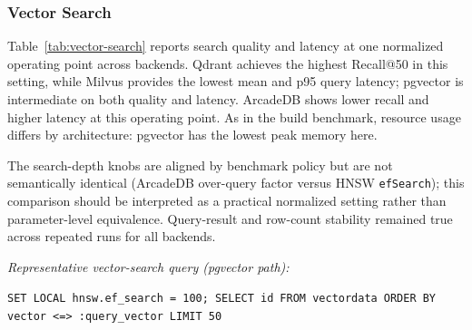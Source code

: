 \documentclass[sigconf, nonacm]{acmart}
\begin{document}
\subsubsection{Vector Search}

\begin{table}[tb]
  \centering
  \caption{Vector search on Stack Overflow vectors (k=50, 1,000 queries, mean over 3 runs; normalized depth: ArcadeDB over-query factor=4, pgvector/Qdrant/Milvus \texttt{efSearch}=100).}
  \label{tab:vector-search}
  \small
\end{table}

Table~\ref{tab:vector-search} reports search quality and latency at one normalized operating point across backends. Qdrant achieves the highest Recall@50 in this setting, while Milvus provides the lowest mean and p95 query latency; pgvector is intermediate on both quality and latency. ArcadeDB shows lower recall and higher latency at this operating point. As in the build benchmark, resource usage differs by architecture: pgvector has the lowest peak memory here.

The search-depth knobs are aligned by benchmark policy but are not semantically identical (ArcadeDB over-query factor versus HNSW \texttt{efSearch}); this comparison should be interpreted as a practical normalized setting rather than parameter-level equivalence. Query-result and row-count stability remained true across repeated runs for all backends.

\par\smallskip\noindent\hspace*{1em}\textit{Representative vector-search query (pgvector path):}
\begin{flushleft}
\small
\texttt{SET LOCAL hnsw.ef\_search = 100;}\
\texttt{SELECT id}\
\texttt{FROM vectordata}\
\texttt{ORDER BY vector <=> :query\_vector}\
\texttt{LIMIT 50}
\end{flushleft}
\end{document}
